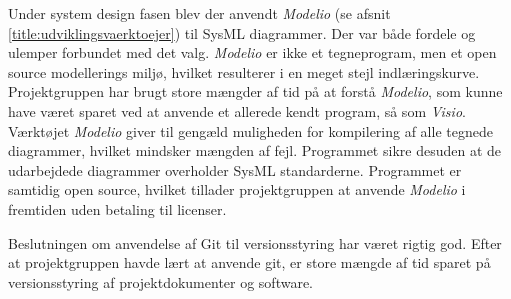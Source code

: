 Under system design fasen blev der anvendt \textit{Modelio} (se afsnit \ref{title:udviklingsvaerktoejer}) til SysML diagrammer. Der var både fordele og ulemper forbundet med det valg. \textit{Modelio} er ikke et tegneprogram, men et open source modellerings miljø, hvilket resulterer i en meget stejl indlæringskurve. Projektgruppen har brugt store mængder af tid på at forstå \textit{Modelio}, som kunne have været sparet ved at anvende et allerede kendt program, så som \textit{Visio}. Værktøjet \textit{Modelio} giver til gengæld muligheden for kompilering af alle tegnede diagrammer, hvilket mindsker mængden af fejl. Programmet sikre desuden at de udarbejdede diagrammer overholder SysML standarderne. Programmet er samtidig open source, hvilket tillader projektgruppen at anvende \textit{Modelio} i fremtiden uden betaling til licenser.

Beslutningen om anvendelse af Git til versionsstyring har været rigtig god. Efter at projektgruppen havde lært at anvende git, er store mængde af tid sparet på versionsstyring af projektdokumenter og software.

